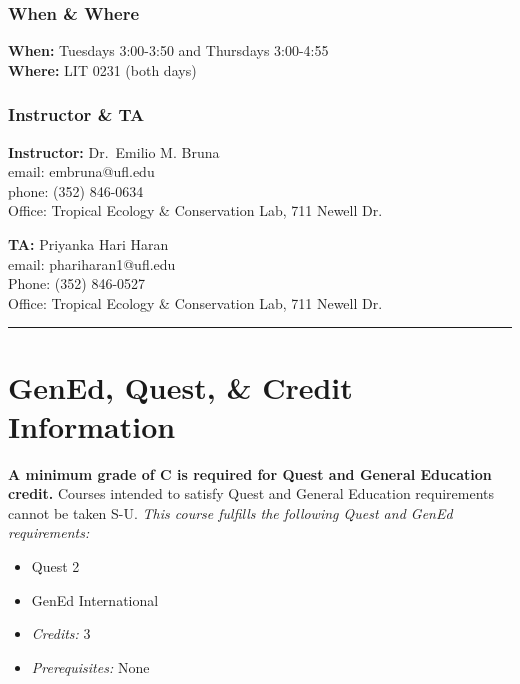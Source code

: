 \documentclass[
  10pt,
  letterpaper,
  oneside,
  open=any]{scrbook}
\providecommand{\tightlist}{%
  \setlength{\itemsep}{0pt}\setlength{\parskip}{0pt}}\usepackage{longtable,booktabs,array}
\begin{document}
\subsection*{When \& Where}\label{when-where}

\textbf{When:} Tuesdays 3:00-3:50 and Thursdays 3:00-4:55\\
\textbf{Where:} LIT 0231 (both days)

\subsection*{Instructor \& TA}\label{instructor-ta}

\textbf{Instructor:} Dr.~Emilio M. Bruna\\
email: embruna@ufl.edu\\
phone: (352) 846-0634\\
Office: Tropical Ecology \& Conservation Lab, 711 Newell Dr.

\textbf{TA:} Priyanka Hari Haran\\
email: phariharan1@ufl.edu\\
Phone: (352) 846-0527\\
Office: Tropical Ecology \& Conservation Lab, 711 Newell Dr.

\begin{center}\rule{0.5\linewidth}{0.5pt}\end{center}


\chapter{GenEd, Quest, \& Credit
Information}\label{gened-quest-credit-information}

\textbf{A minimum grade of C is required for Quest and General Education
credit.} Courses intended to satisfy Quest and General Education
requirements cannot be taken S-U. \emph{This course fulfills the
following Quest and GenEd requirements:}

\begin{itemize}
\tightlist
\item
  Quest 2
\item
  GenEd International
\item
  \emph{Credits:} 3
\item
  \emph{Prerequisites:} None
\end{itemize}
\end{document}
